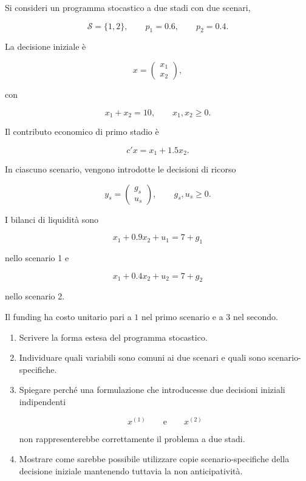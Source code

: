 \begin{exercise}

\label{ex:cap14-forma-estesa-nonanticipativita}

Si consideri un programma stocastico a due stadi con due scenari,

\[
\mathcal S=\{1,2\},
\qquad
p_1=0.6,
\qquad
p_2=0.4.
\]

La decisione iniziale \`e

\[
x=
\begin{pmatrix}
x_1\\
x_2
\end{pmatrix},
\]

\noindent con

\[
x_1+x_2=10,
\qquad
x_1,x_2\geq0.
\]

Il contributo economico di primo stadio \`e

\[
c'x
=
x_1+1.5x_2.
\]

In ciascuno scenario, vengono introdotte le decisioni di ricorso

\[
y_s=
\begin{pmatrix}
g_s\\
u_s
\end{pmatrix},
\qquad
g_s,u_s\geq0.
\]

I bilanci di liquidit\`a sono

\[
x_1+0.9x_2+u_1
=
7+g_1
\]

nello scenario 1 e

\[
x_1+0.4x_2+u_2
=
7+g_2
\]

nello scenario 2.

Il funding ha costo unitario pari a $1$ nel primo scenario e a $3$ nel
secondo.

\begin{enumerate}

\item Scrivere la forma estesa del programma stocastico.

\item Individuare quali variabili sono comuni ai due scenari e quali sono
scenario-specifiche.

\item Spiegare perch\'e una formulazione che introducesse due decisioni
iniziali indipendenti

\[
x^{(1)}
\qquad\text{e}\qquad
x^{(2)}
\]

non rappresenterebbe correttamente il problema a due stadi.

\item Mostrare come sarebbe possibile utilizzare copie scenario-specifiche
della decisione iniziale mantenendo tuttavia la non anticipativit\`a.

\end{enumerate}

\end{exercise}

